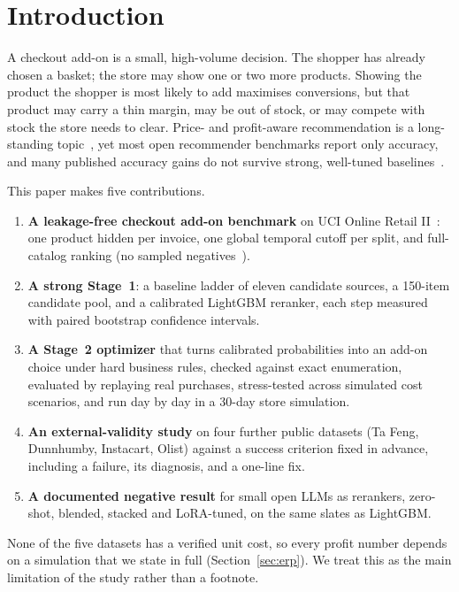 \documentclass[11pt]{article}
\begin{document}
\section{Introduction}

A checkout add-on is a small, high-volume decision.
The shopper has already chosen a basket; the store may show one or two more products.
Showing the product the shopper is most likely to add maximises conversions, but that product may carry a thin margin, may be out of stock, or may compete with stock the store needs to clear.
Price- and profit-aware recommendation is a long-standing topic~\citep{jannach2017price,abdollahpouri2020multistakeholder}, yet most open recommender benchmarks report only accuracy, and many published accuracy gains do not survive strong, well-tuned baselines~\citep{dacrema2019progress}.

This paper makes five contributions.
\begin{enumerate}
\item \textbf{A leakage-free checkout add-on benchmark} on UCI Online Retail II~\citep{chen2019onlineretail}: one product hidden per invoice, one global temporal cutoff per split, and full-catalog ranking (no sampled negatives~\citep{krichene2020sampled}).
\item \textbf{A strong Stage~1}: a baseline ladder of eleven candidate sources, a 150-item candidate pool, and a calibrated LightGBM reranker, each step measured with paired bootstrap confidence intervals.
\item \textbf{A Stage~2 optimizer} that turns calibrated probabilities into an add-on choice under hard business rules, checked against exact enumeration, evaluated by replaying real purchases, stress-tested across simulated cost scenarios, and run day by day in a 30-day store simulation.
\item \textbf{An external-validity study} on four further public datasets (Ta Feng, Dunnhumby, Instacart, Olist) against a success criterion fixed in advance, including a failure, its diagnosis, and a one-line fix.
\item \textbf{A documented negative result} for small open LLMs as rerankers, zero-shot, blended, stacked and LoRA-tuned, on the same slates as LightGBM.
\end{enumerate}

None of the five datasets has a verified unit cost, so every profit number depends on a simulation that we state in full (Section~\ref{sec:erp}).
We treat this as the main limitation of the study rather than a footnote.
\end{document}
